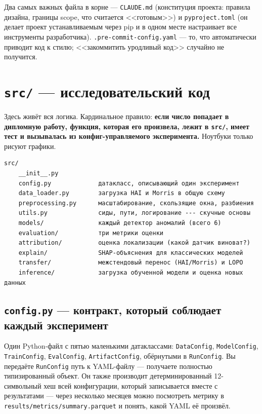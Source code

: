 \documentclass[11pt,a4paper]{article}
\newcommand{\code}[1]{\texttt{#1}}
\begin{document}
Два самых важных файла в корне --- \code{CLAUDE.md} (конституция проекта: правила дизайна, границы scope, что считается <<готовым>>) и \code{pyproject.toml} (он делает проект устанавливаемым через pip и в одном месте настраивает все инструменты разработчика). \code{.pre-commit-config.yaml} --- то, что автоматически приводит код к стилю; <<закоммитить уродливый код>> случайно не получится.

\section{\texttt{src/} --- исследовательский код}

Здесь живёт вся логика. Кардинальное правило: \textbf{если число попадает в дипломную работу, функция, которая его произвела, лежит в \code{src/}, имеет тест и вызывалась из конфиг-управляемого эксперимента.} Ноутбуки только рисуют графики.

\begin{Verbatim}
src/
    __init__.py
    config.py             датакласс, описывающий один эксперимент
    data_loader.py        загрузка HAI и Morris в общую схему
    preprocessing.py      масштабирование, скользящие окна, разбиения
    utils.py              сиды, пути, логирование --- скучные основы
    models/               каждый детектор аномалий (всего 6)
    evaluation/           три метрики оценки
    attribution/          оценка локализации (какой датчик виноват?)
    explain/              SHAP-объяснения для классических моделей
    transfer/             межстендовый перенос (HAI/Morris) и LOPO
    inference/            загрузка обученной модели и оценка новых данных
\end{Verbatim}

\subsection{\texttt{config.py} --- контракт, который соблюдает каждый эксперимент}

Один Python-файл с пятью маленькими датаклассами: \code{DataConfig}, \code{ModelConfig}, \code{TrainConfig}, \code{EvalConfig}, \code{ArtifactConfig}, обёрнутыми в \code{RunConfig}. Вы передаёте \code{RunConfig} путь к YAML-файлу --- получаете полностью типизированный объект. Он также производит детерминированный 12-символьный хеш всей конфигурации, который записывается вместе с результатами --- через несколько месяцев можно посмотреть метрику в \code{results/metrics/summary.parquet} и понять, какой YAML её произвёл.
\end{document}
